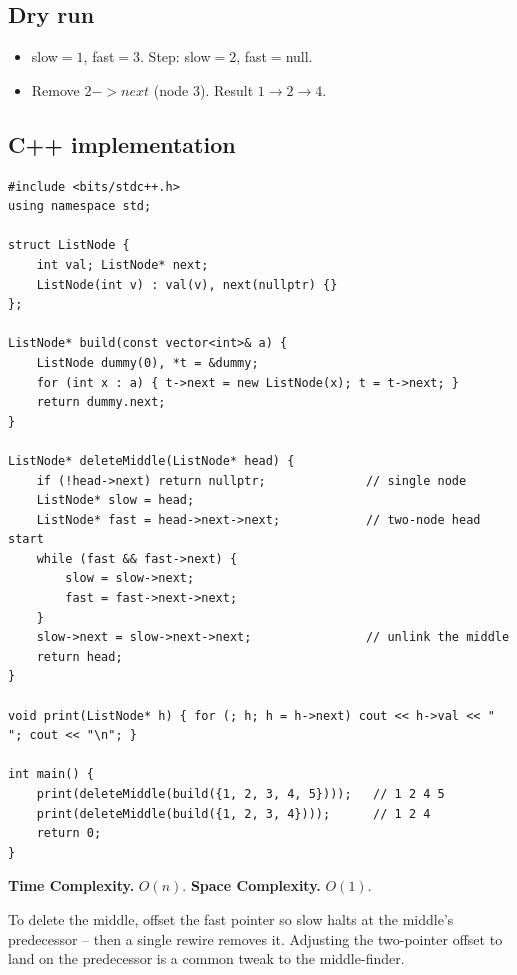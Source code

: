 \subsection*{Dry run}


\begin{itemize}
  \item slow$=1$, fast$=3$. Step: slow$=2$, fast$=$null.
  \item Remove $2->next$ (node $3$). Result $1\to2\to4$.
\end{itemize}

\subsection*{C++ implementation}

\begin{lstlisting}
#include <bits/stdc++.h>
using namespace std;

struct ListNode {
    int val; ListNode* next;
    ListNode(int v) : val(v), next(nullptr) {}
};

ListNode* build(const vector<int>& a) {
    ListNode dummy(0), *t = &dummy;
    for (int x : a) { t->next = new ListNode(x); t = t->next; }
    return dummy.next;
}

ListNode* deleteMiddle(ListNode* head) {
    if (!head->next) return nullptr;              // single node
    ListNode* slow = head;
    ListNode* fast = head->next->next;            // two-node head start
    while (fast && fast->next) {
        slow = slow->next;
        fast = fast->next->next;
    }
    slow->next = slow->next->next;                // unlink the middle
    return head;
}

void print(ListNode* h) { for (; h; h = h->next) cout << h->val << " "; cout << "\n"; }

int main() {
    print(deleteMiddle(build({1, 2, 3, 4, 5})));   // 1 2 4 5
    print(deleteMiddle(build({1, 2, 3, 4})));      // 1 2 4
    return 0;
}
\end{lstlisting}

\begin{complexitybox}
\textbf{Time Complexity.} $O(n)$. \textbf{Space Complexity.} $O(1)$.
\end{complexitybox}

\begin{takeawaybox}
To delete the middle, offset the fast pointer so slow halts at the middle's
predecessor -- then a single rewire removes it. Adjusting the two-pointer
offset to land on the predecessor is a common tweak to the middle-finder.
\end{takeawaybox}
